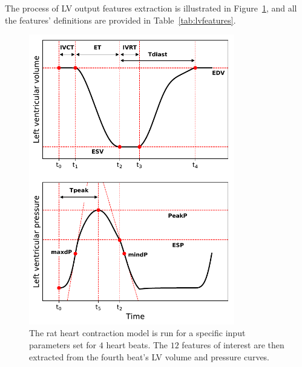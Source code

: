 \vspace{0.3cm}\noindent
The process of LV output features extraction is illustrated in Figure~\ref{fig:lvfeatsextraction}, and all the features' definitions are provided in Table~\ref{tab:lvfeatures}.

\begin{figure}[!ht]
    \myfloatalign
    \includegraphics[width=0.8\textwidth]{figures/chapter03/lvv_lvp_features_explained_together.pdf}
    \caption{The rat heart contraction model is run for a specific input parameters set for $4$ heart beats. The $12$ features of interest are then extracted from the fourth beat's LV volume and pressure curves.}
    \label{fig:lvfeatsextraction}
\end{figure}
    
